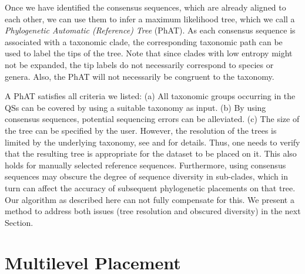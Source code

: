Once we have identified the consensus sequences, which are already aligned to each other,
we can use them to infer a maximum likelihood tree, which we call a \emph{Phylogenetic Automatic (Reference) Tree} (PhAT).
As each consensus sequence is associated with a taxonomic clade,
the corresponding taxonomic path can be used to label the tips of the tree.
Note that since clades with low entropy might not be expanded, the tip labels do not necessarily correspond to species or genera.
Also, the \ac{PhAT} will not necessarily be congruent to the taxonomy.

A \ac{PhAT} satisfies all criteria we listed:
(a) All taxonomic groups occurring in the \acp{QS} can be covered by using a suitable taxonomy as input.
(b) By using consensus sequences, potential sequencing errors can be alleviated.
(c) The size of the tree can be specified by the user.
However, the resolution of the trees is limited by the underlying taxonomy,
see  and  for details.
Thus, one needs to verify that the resulting tree is appropriate for the dataset to be placed on it.
This also holds for manually selected reference sequences.
Furthermore, using consensus sequences may obscure the degree of sequence diversity in sub-clades,
which in turn can affect the accuracy of subsequent phylogenetic placements on that tree.
Our algorithm as described here can not fully compensate for this.
We present a method to address both issues (tree resolution and obscured diversity) in the next Section.


\section{Multilevel Placement}
\label{ch:AutomaticTrees:sec:MultilevelPlacement}

